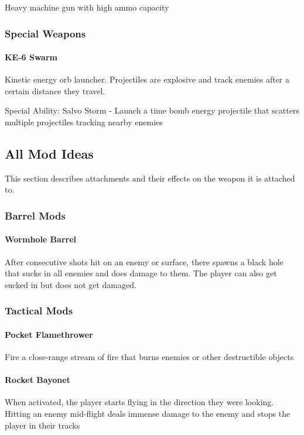\documentclass[../Main.tex]{subfiles}
\begin{document}
Heavy machine gun with high ammo capacity

\subsubsection{Special Weapons}

\paragraph{KE-6 Swarm}

Kinetic energy orb launcher. Projectiles are explosive and track enemies after a certain distance they travel. 

Special Ability: Salvo Storm - Launch a time bomb energy projectile that scatters multiple projectiles tracking nearby enemies

\subsection{All Mod Ideas}

This section describes attachments and their effects on the weapon it is attached to.

\subsubsection{Barrel Mods}

\paragraph{Wormhole Barrel}

After consecutive shots hit on an enemy or surface, there spawns a black hole that sucks in all enemies and does damage to them. The player can also get sucked in but does not get damaged. 

\subsubsection{Tactical Mods}

\paragraph{Pocket Flamethrower} 

Fire a close-range stream of fire that burns enemies or other destructible objects

\paragraph{Rocket Bayonet}

When activated, the player starts flying in the direction they were looking. Hitting an enemy mid-flight deals immense damage to the enemy and stops the player in their tracks
\end{document}

